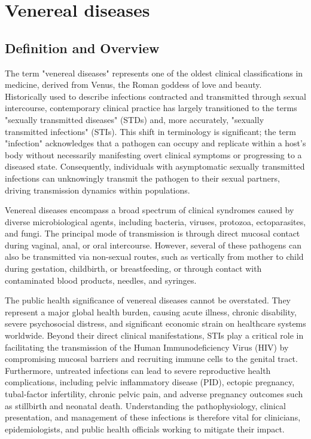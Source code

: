 \chapter{Venereal diseases}

\section*{Definition and Overview}
The term "venereal diseases" represents one of the oldest clinical classifications in medicine, derived from Venus, the Roman goddess of love and beauty. Historically used to describe infections contracted and transmitted through sexual intercourse, contemporary clinical practice has largely transitioned to the terms "sexually transmitted diseases" (STDs) and, more accurately, "sexually transmitted infections" (STIs). This shift in terminology is significant; the term "infection" acknowledges that a pathogen can occupy and replicate within a host's body without necessarily manifesting overt clinical symptoms or progressing to a diseased state. Consequently, individuals with asymptomatic sexually transmitted infections can unknowingly transmit the pathogen to their sexual partners, driving transmission dynamics within populations.

Venereal diseases encompass a broad spectrum of clinical syndromes caused by diverse microbiological agents, including bacteria, viruses, protozoa, ectoparasites, and fungi. The principal mode of transmission is through direct mucosal contact during vaginal, anal, or oral intercourse. However, several of these pathogens can also be transmitted via non-sexual routes, such as vertically from mother to child during gestation, childbirth, or breastfeeding, or through contact with contaminated blood products, needles, and syringes.

The public health significance of venereal diseases cannot be overstated. They represent a major global health burden, causing acute illness, chronic disability, severe psychosocial distress, and significant economic strain on healthcare systems worldwide. Beyond their direct clinical manifestations, STIs play a critical role in facilitating the transmission of the Human Immunodeficiency Virus (HIV) by compromising mucosal barriers and recruiting immune cells to the genital tract. Furthermore, untreated infections can lead to severe reproductive health complications, including pelvic inflammatory disease (PID), ectopic pregnancy, tubal-factor infertility, chronic pelvic pain, and adverse pregnancy outcomes such as stillbirth and neonatal death. Understanding the pathophysiology, clinical presentation, and management of these infections is therefore vital for clinicians, epidemiologists, and public health officials working to mitigate their impact.

